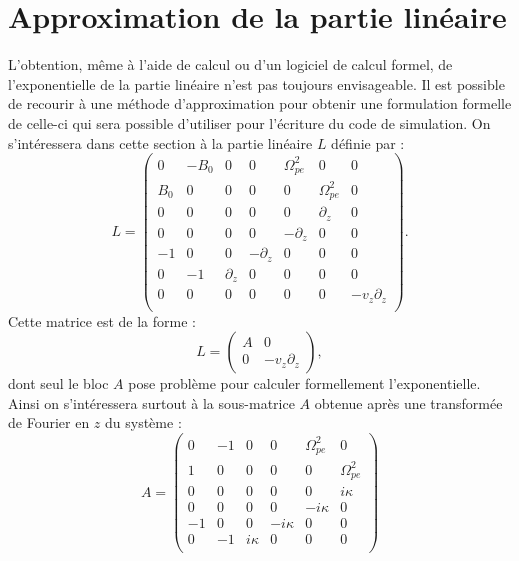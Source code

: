 
\section{Approximation de la partie linéaire}
\label{s3:approx}

L'obtention, même à l'aide de calcul ou d'un logiciel de calcul formel, de l'exponentielle de la partie linéaire n'est pas toujours envisageable. Il est possible de recourir à une méthode d'approximation pour obtenir une formulation formelle de celle-ci qui sera possible d'utiliser pour l'écriture du code de simulation. On s'intéressera dans cette section à la partie linéaire $L$ définie par :
$$
  L = \begin{pmatrix}
    0   & -B_0 & 0          &  0          &  \Omega_{pe}^2 & 0             & 0 \\
    B_0 &  0   & 0          &  0          &  0             & \Omega_{pe}^2 & 0 \\
    0   &  0   & 0          &  0          &  0             & \partial_z    & 0 \\
    0   &  0   & 0          &  0          & -\partial_z    & 0             & 0 \\
   -1   &  0   & 0          & -\partial_z &  0             & 0             & 0 \\
    0   & -1   & \partial_z &  0          &  0             & 0             & 0 \\
    0   &  0   & 0          &  0          &  0             & 0             & -v_z\partial_z \\
  \end{pmatrix}.
$$
Cette matrice est de la forme :
$$
  L = \begin{pmatrix}
    A & 0 \\
    0 & -v_z\partial_z
  \end{pmatrix},
$$
dont seul le bloc $A$ pose problème pour calculer formellement l'exponentielle. Ainsi on s'intéressera surtout à la sous-matrice $A$ obtenue après une transformée de Fourier en $z$ du système :
\begin{equation}
  A = \begin{pmatrix}
    0 & -1 & 0       &  0       &  \Omega_{pe}^2  & 0             \\
    1 &  0 & 0       &  0       &  0              & \Omega_{pe}^2 \\
    0 &  0 & 0       &  0       &  0              & i\kappa       \\
    0 &  0 & 0       &  0       & -i\kappa        & 0             \\
   -1 &  0 & 0       & -i\kappa &  0              & 0             \\
    0 & -1 & i\kappa &  0       &  0              & 0             \\
  \end{pmatrix}
  \label{eq:3:A}
\end{equation}

